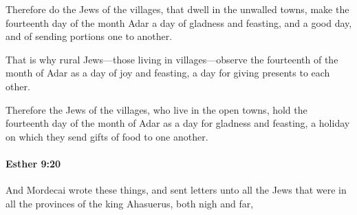 			\begin{versebox}
					\item[BHS] 
					\item[LXX] 
					\item[ASV] Therefore do the Jews of the villages, that dwell in the unwalled towns, make the fourteenth day of the month Adar a day of gladness and feasting, and a good day, and of sending portions one to another.
					\item[NIV] That is why rural Jews—those living in villages—observe the fourteenth of the month of Adar as a day of joy and feasting, a day for giving presents to each other.
					\item[NRSV] Therefore the Jews of the villages, who live in the open towns, hold the fourteenth day of the month of Adar as a day for gladness and feasting, a holiday on which they send gifts of food to one another.
			\end{versebox}

		\paragraph{Esther 9:20} %
			\label{ESTHER-9-20}

			And Mordecai wrote these things, and sent letters unto all the Jews that were in all the provinces of the king Ahasuerus, both nigh and far,

